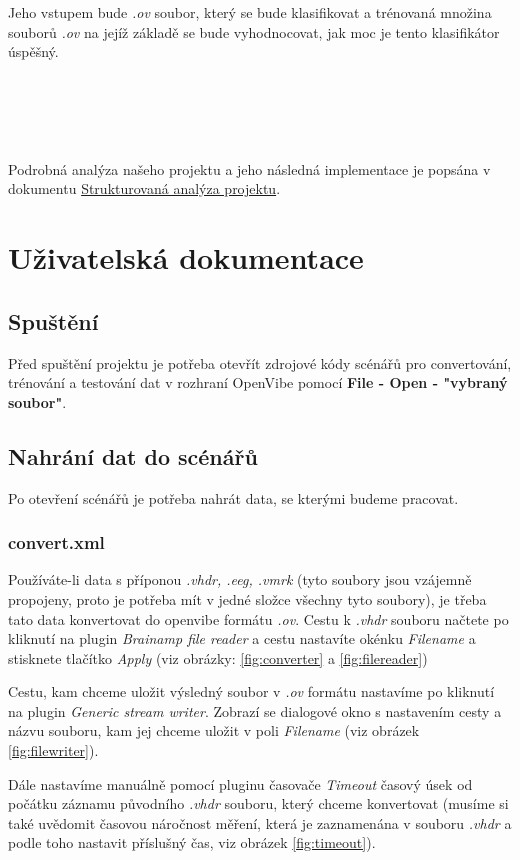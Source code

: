 \documentclass{report}
\begin{document}
Jeho vstupem bude \textit{.ov} soubor, který se bude klasifikovat a trénovaná množina souborů \textit{.ov} na jejíž základě se bude vyhodnocovat, jak moc je tento klasifikátor úspěšný.
\\
\\
\\
\\
\\
\\
Podrobná analýza našeho projektu a jeho následná implementace je popsána v dokumentu
\href{https://docs.google.com/document/d/1DZhPO0-b6VwDLwlwbTCjLrkphk3x23aponyvLbC3uOU/edit?usp=sharing}{Strukturovaná analýza projektu}.


\chapter{Uživatelská dokumentace}
\section{Spuštění}
Před spuštění projektu je potřeba otevřít zdrojové kódy scénářů pro convertování, trénování a testování dat v rozhraní OpenVibe pomocí \textbf{File - Open - "vybraný soubor"}.

 
\section{Nahrání dat do scénářů}
Po otevření scénářů je potřeba nahrát data, se kterými budeme pracovat.
\subsection{convert.xml}
 Používáte-li data s příponou \textit{.vhdr, .eeg, .vmrk} (tyto soubory jsou vzájemně propojeny, proto je potřeba mít v jedné složce všechny tyto soubory), je třeba tato data konvertovat do openvibe formátu \textit{.ov}. Cestu k \textit{.vhdr} souboru načtete po kliknutí na plugin \textit{Brainamp file reader} a cestu nastavíte okénku \textit{Filename} a stisknete tlačítko \textit{Apply} (viz obrázky: \ref{fig:converter} a \ref{fig:filereader})
 
 Cestu, kam chceme uložit výsledný soubor v \textit{.ov} formátu nastavíme po kliknutí na plugin \textit{Generic stream writer}. Zobrazí se dialogové okno s nastavením cesty a názvu souboru, kam jej chceme uložit v poli \textit{Filename} (viz obrázek \ref{fig:filewriter}). 

 Dále nastavíme manuálně pomocí pluginu časovače \textit{Timeout} časový úsek od počátku záznamu původního \textit{.vhdr} souboru, který chceme konvertovat (musíme si také uvědomit časovou náročnost měření, která je zaznamenána v souboru \textit{.vhdr} a podle toho nastavit příslušný čas, viz obrázek \ref{fig:timeout}).
 
\end{document}
